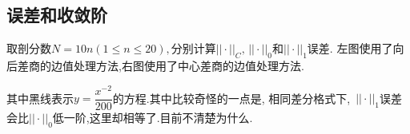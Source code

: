 \documentclass[11pt,reqno]{article}
\numberwithin{equation}{section}
\begin{document}
\subsection{误差和收敛阶}
取剖分数$N=10n(1\le n\le 20),$分别计算$||\cdot||_C,\,||\cdot||_0$和$||\cdot||_1$误差.
左图使用了向后差商的边值处理方法,右图使用了中心差商的边值处理方法.
\begin{figure}[h]
	\centering
\end{figure}

其中黑线表示$y=\dfrac{x^{-2}}{200}$的方程.其中比较奇怪的一点是,
相同差分格式下,\, $||\cdot||_1$误差会比$||\cdot||_0$低一阶,这里却相等了.目前不清楚为什么.
\end{document}
